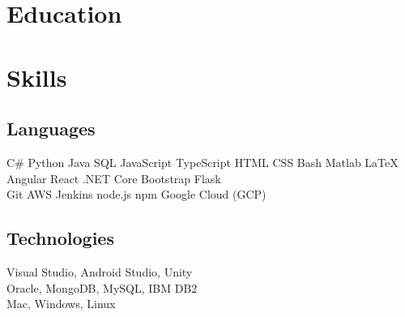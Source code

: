 \documentclass[]{deedy-resume}
\begin{document}
\section{Education}
\sectionsep


\section{Skills}
\begin{minipage}[t]{.6\textwidth}
\subsection{Languages}
C\# \textbullet{}  Python \textbullet{} Java \textbullet{} SQL \textbullet{} JavaScript \textbullet{} TypeScript \textbullet{} HTML \textbullet{} CSS \textbullet{} Bash \textbullet{} Matlab \textbullet{} \LaTeX\ \\ 
Angular \textbullet{} React \textbullet{} .NET Core \textbullet{} Bootstrap \textbullet{} Flask \\
Git \textbullet{} AWS \textbullet{} Jenkins \textbullet{}  node.js \textbullet{} npm \textbullet{} Google Cloud (GCP)
\sectionsep
\end{minipage}
\hfill
\begin{minipage}[t]{.35\textwidth}
\subsection{Technologies}
 Visual Studio, Android Studio, Unity \\
 Oracle, MongoDB, MySQL, IBM DB2\\
 Mac, Windows, Linux\\
\end{minipage}
\end{document}
